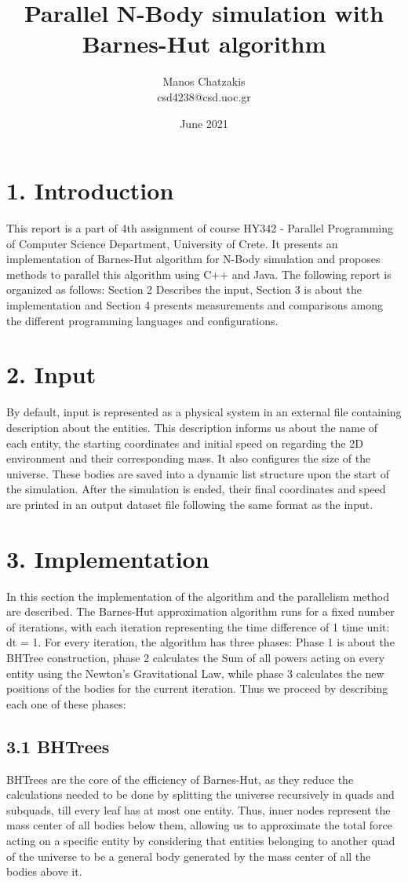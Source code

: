 \documentclass{article}
\title{\vspace{-2.0cm}\textbf{Parallel N-Body simulation with Barnes-Hut algorithm}}
\author{Manos Chatzakis\\csd4238@csd.uoc.gr}
\date{June 2021}
\begin{document}
\maketitle

\section*{1. Introduction}
This report is a part of 4th assignment of course HY342 - Parallel Programming of Computer Science Department, University of Crete. It presents an implementation of Barnes-Hut algorithm for N-Body simulation and proposes methods to parallel this algorithm using C++ and Java. The following report is organized as follows: Section 2 Describes the input, Section 3 is about the implementation and Section 4 presents measurements and comparisons among the different programming languages and configurations.

\section*{2. Input }
By default, input is represented as a physical system in an external file containing description about the entities. This description informs us about the name of each entity, the starting coordinates and initial speed on regarding the 2D environment and their corresponding mass. It also configures the size of the universe. These bodies are saved into a dynamic list structure upon the start of the simulation. After the simulation is ended, their final coordinates and speed are printed in an output dataset file following the same format as the input.

\section*{3. Implementation}
In this section the implementation of the algorithm and the parallelism method are described. The Barnes-Hut approximation algorithm runs for a fixed number of iterations, with each iteration representing the time difference of 1 time unit: dt = 1. For every iteration, the algorithm has three phases: Phase 1 is about the BHTree construction, phase 2 calculates the Sum of all powers acting on every entity using the Newton's Gravitational Law, while phase 3 calculates the new positions of the bodies for the current iteration. Thus we proceed by describing each one of these phases:

\subsection*{3.1 BHTrees}
BHTrees are the core of the efficiency of Barnes-Hut, as they reduce the calculations needed to be done by splitting the universe recursively in quads and subquads, till every leaf has at most one entity. Thus, inner nodes represent the mass center of all bodies below them, allowing us to approximate the total force acting on a specific entity by considering that entities belonging to another quad of the universe to be a general body generated by the mass center of all the bodies above it. 
\end{document}
